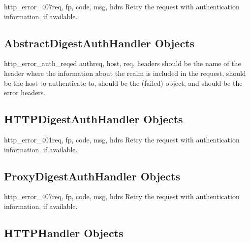 \begin{methoddesc}[ProxyBasicAuthHandler]{http_error_407}{req, fp, code, 
                                                        msg, hdrs}
Retry the request with authentication information, if available.
\end{methoddesc}


\subsection{AbstractDigestAuthHandler Objects
            \label{abstract-digest-auth-handler}}

\begin{methoddesc}[AbstractDigestAuthHandler]{http_error_auth_reqed}
                                            {authreq, host, req, headers}
 should be the name of the header where the information about
the realm is included in the request,  should be the host to
authenticate to,  should be the (failed) 
object, and  should be the error headers.
\end{methoddesc}


\subsection{HTTPDigestAuthHandler Objects
            \label{http-digest-auth-handler}}

\begin{methoddesc}[HTTPDigestAuthHandler]{http_error_401}{req, fp, code, 
                                                        msg, hdrs}
Retry the request with authentication information, if available.
\end{methoddesc}


\subsection{ProxyDigestAuthHandler Objects
            \label{proxy-digest-auth-handler}}

\begin{methoddesc}[ProxyDigestAuthHandler]{http_error_407}{req, fp, code, 
                                                        msg, hdrs}
Retry the request with authentication information, if available.
\end{methoddesc}


\subsection{HTTPHandler Objects \label{http-handler-objects}}

